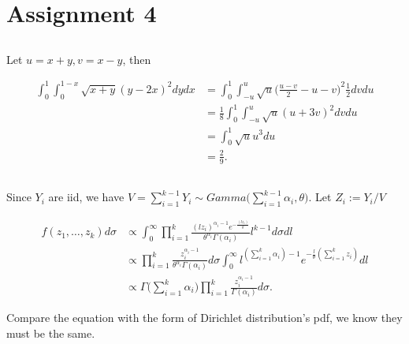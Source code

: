 \clearpage
\section{Assignment 4}

\subsection{} %

Let $u = x+y, v=x-y$, then

\begin{align}
    \int_0^1\int_0^{1-x}\sqrt{x+y}(y-2x)^2dydx
        &= \int_0^1\int_{-u}^{u}\sqrt{u}\bigg(\frac{u-v}{2}-u-v\bigg)^2 \frac{1}{2} dvdu \\
        &= \frac{1}{8} \int_0^1\int_{-u}^{u} \sqrt{u} (u+3v)^2 dvdu \\
        &= \int_0^1 \sqrt{u} u^3 du \\
        &= \frac{2}{9}.
\end{align}

\subsection{} %

Since $Y_i$ are iid, we have $V=\sum_{i=1}^{k-1} Y_i\sim Gamma\big(\sum_{i=1}^{k-1} \alpha_i, \theta\big)$.
Let $Z_i:=Y_i/V$

\begin{align}
    f(z_1,\dots,z_k) d\sigma
        &\propto \int_0^\infty \prod_{i=1}^{k}\frac{(lz_i)^{\alpha_i-1}e^{-\frac{(lz_i)}{\theta}}}{\theta^{\alpha_i}\Gamma(\alpha_i)} l^{k-1} d\sigma dl \\
        &\propto \prod_{i=1}^{k}\frac{z_i^{\alpha_i-1}}{\theta^{\alpha_i}\Gamma(\alpha_i)} d\sigma  \int_0^\infty l^{(\sum_{i=1}^k\alpha_i) - 1} e^{-\frac{l}{\theta}(\sum_{i=1}^k z_i)}dl \\
        &\propto \Gamma\bigg(\sum_{i=1}^k\alpha_i\bigg)\prod_{i=1}^{k}\frac{z_i^{\alpha_i-1}}{\Gamma(\alpha_i)} d\sigma.
\end{align}

Compare the equation with the form of Dirichlet distribution's pdf,
we know they must be the same.

\subsection{} %

